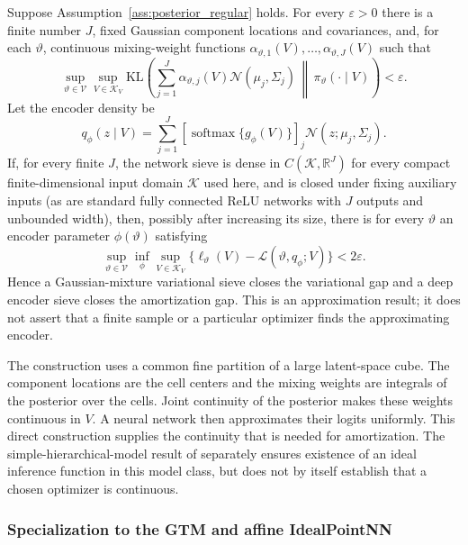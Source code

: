 \begin{proposition}
\label{prop:mog_encoder_tightness}
Suppose Assumption~\ref{ass:posterior_regular} holds.  For every
$\varepsilon>0$ there is a finite number $J$, fixed Gaussian component
locations and covariances, and, for each $\vartheta$, continuous mixing-weight
functions $\alpha_{\vartheta,1}(V),\ldots,
\alpha_{\vartheta,J}(V)$ such that
\[
 \sup_{\vartheta\in\mathcal V}\sup_{V\in\mathcal K_V}
 \mathrm{KL}\!\left(
 \sum_{j=1}^J\alpha_{\vartheta,j}(V)
 \mathcal N(\mu_j,\Sigma_j)
 \,\middle\|\,\pi_\vartheta(\cdot\mid V)\right)<\varepsilon.
\]
Let the encoder density be
\[
 q_\phi(z\mid V)=\sum_{j=1}^J
 [\operatorname{softmax}\{g_\phi(V)\}]_j
 \mathcal N(z;\mu_j,\Sigma_j).
\]
If, for every finite $J$, the network sieve is dense in
$C(\mathcal K,\mathbb R^J)$ for every compact finite-dimensional input domain
$\mathcal K$ used here, and is closed under fixing auxiliary inputs (as are
standard fully connected ReLU networks with $J$ outputs and unbounded width),
then, possibly after increasing its size, there is for every $\vartheta$ an
encoder parameter $\phi(\vartheta)$ satisfying
\begin{equation}
 \sup_{\vartheta\in\mathcal V}\inf_\phi
 \sup_{V\in\mathcal K_V}
 \{\ell_\vartheta(V)-\mathcal L(\vartheta,q_\phi;V)\}
 <2\varepsilon.
 \label{eq:uniform_mog_tightness}
\end{equation}
Hence a Gaussian-mixture variational sieve closes the variational gap and a
deep encoder sieve closes the amortization gap.  This is an approximation
result; it does not assert that a finite sample or a particular optimizer
finds the approximating encoder.
\end{proposition}

The construction uses a common fine partition of a large latent-space cube.
The component locations are the cell centers and the mixing weights are
integrals of the posterior over the cells.  Joint continuity of the posterior
makes these weights continuous in $V$.  A neural network then approximates
their logits uniformly.  This direct construction supplies the continuity
that is needed for amortization.  The simple-hierarchical-model result of
\citet{MargossianBlei2024} separately ensures existence of an ideal inference
function in this model class, but does not by itself establish that a chosen
optimizer is continuous.

\subsubsection{Specialization to the GTM and affine IdealPointNN}
\label{subsubsec:model_specific_sieves}

